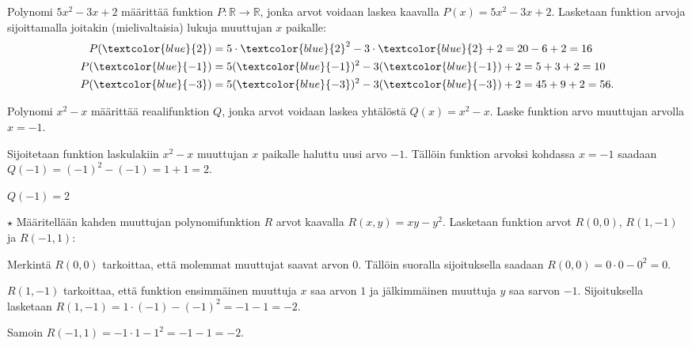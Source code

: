 \begin{esimerkki}

Polynomi $5x^2-3x+2$ määrittää funktion $P:\mathbb{R}\rightarrow \mathbb{R}$, jonka arvot voidaan laskea kaavalla $P(x)=5x^2-3x+2$. Lasketaan funktion arvoja sijoittamalla joitakin (mielivaltaisia) lukuja muuttujan $x$ paikalle:
\begin{align*}
    P(\textcolor{blue}{2}) & = 5\cdot \textcolor{blue}{2}^2-3\cdot \textcolor{blue}{2}+2 = 20 - 6 + 2 = 16 \\
    P(\textcolor{blue}{-1}) & = 5(\textcolor{blue}{-1})^2-3(\textcolor{blue}{-1})+2 = 5 + 3 + 2 = 10 \\
    P(\textcolor{blue}{-3}) & = 5(\textcolor{blue}{-3})^2-3(\textcolor{blue}{-3})+2 = 45 + 9 + 2 = 56.
\end{align*}
\end{esimerkki}

\begin{esimerkki}

Polynomi $x^2-x$ määrittää reaalifunktion $Q$, jonka arvot voidaan laskea yhtälöstä $Q(x)=x^2-x$. Laske funktion arvo muuttujan arvolla $x=-1$. 

		\begin{esimratk}
			Sijoitetaan funktion laskulakiin $x^2-x$ muuttujan $x$ paikalle haluttu uusi arvo $-1$. Tällöin funktion arvoksi kohdassa $x=-1$ saadaan $Q(-1)=(-1)^2-(-1)=1+1=2$.
			
		\end{esimratk}
		
		\begin{esimvast}
		$Q(-1)=2$
		
		\end{esimvast}
\end{esimerkki}

\begin{esimerkki} $\star$ Määritellään kahden muuttujan polynomifunktion $R$ arvot kaavalla $R(x,y)=xy-y^2$. Lasketaan funktion arvot $R(0,0)$, $R(1,-1)$ ja $R(-1,1)$:

Merkintä $R(0,0)$ tarkoittaa, että molemmat muuttujat saavat arvon $0$. Tällöin suoralla sijoituksella saadaan $R(0,0)=0\cdot 0-0^2=0$.

$R(1,-1)$ tarkoittaa, että funktion ensimmäinen muuttuja $x$ saa arvon $1$ ja jälkimmäinen muuttuja $y$ saa sarvon $-1$. Sijoituksella lasketaan $R(1,-1)=1\cdot (-1)-(-1)^2=-1-1=-2$.

Samoin $R(-1,1)=-1\cdot1-1^2=-1-1=-2$.

\end{esimerkki}


